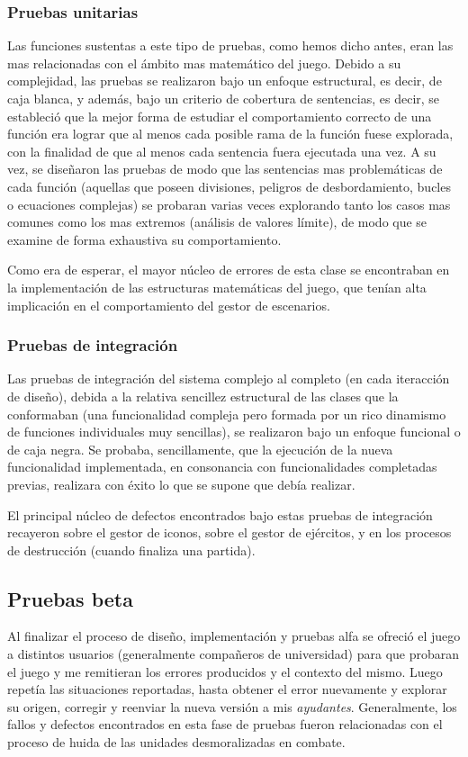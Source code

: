 \subsubsection{Pruebas unitarias}
Las funciones sustentas a este tipo de pruebas, como hemos dicho
antes, eran las mas relacionadas con el ámbito mas matemático del
juego. Debido a su complejidad, las pruebas se realizaron bajo un
enfoque estructural, es decir, de caja blanca, y además, bajo un
criterio de cobertura de sentencias, es decir, se estableció que la
mejor forma de estudiar el comportamiento correcto de una función era
lograr que al menos cada posible rama de la función fuese explorada,
con la finalidad de que al menos cada sentencia fuera ejecutada una
vez. A su vez, se diseñaron las pruebas de modo que las sentencias mas
problemáticas de cada función (aquellas que poseen divisiones,
peligros de desbordamiento, bucles o ecuaciones complejas) se probaran
varias veces explorando tanto los casos mas comunes como los mas
extremos (análisis de valores límite), de modo que se examine de forma
exhaustiva su comportamiento.

Como era de esperar, el mayor núcleo de errores de esta clase se
encontraban en la implementación de las estructuras matemáticas del
juego, que tenían alta implicación en el comportamiento del gestor de
escenarios.

\subsubsection{Pruebas de integración}
Las pruebas de integración del sistema complejo al completo (en cada
iteracción de diseño), debida a la relativa sencillez estructural de
las clases que la conformaban (una funcionalidad compleja pero formada
por un rico dinamismo de funciones individuales muy sencillas), se
realizaron bajo un enfoque funcional o de caja negra. Se probaba,
sencillamente, que la ejecución de la nueva funcionalidad
implementada, en consonancia con funcionalidades completadas previas,
realizara con éxito lo que se supone que debía realizar.

El principal núcleo de defectos encontrados bajo estas pruebas de
integración recayeron sobre el gestor de iconos, sobre el gestor de
ejércitos, y en los procesos de destrucción (cuando finaliza una
partida). 

\subsection{Pruebas beta}
Al finalizar el proceso de diseño, implementación y pruebas alfa se
ofreció el juego a distintos usuarios (generalmente compañeros de
universidad) para que probaran el juego y me remitieran los errores
producidos y el contexto del mismo. Luego repetía las situaciones
reportadas, hasta obtener el error nuevamente y explorar su origen,
corregir y reenviar la nueva versión a mis
\emph{ayudantes}. Generalmente, los fallos y defectos encontrados en
esta fase de pruebas fueron relacionadas con el proceso de huida de
las unidades desmoralizadas en combate.
